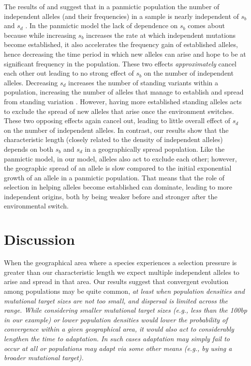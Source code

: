 \documentclass{article}
\newcommand{\gc}[1]{{\it\color{blue}#1}}
\newcommand{\mfp}[1]{{\it\color{red}#1}}
\begin{document}
The results of \citet{softsweepsI} and \citet{softsweepsII} suggest that in a
panmictic population the number of independent alleles (and their frequencies) in a sample
is nearly independent of $s_b$ and $s_d$  \citep[although this
breaks down with fluctuating population size,
][]{Wilson-softsweep}. In the panmictic model the
lack of dependence on $s_b$ comes about because while increasing $s_b$
increases the rate at which independent mutations become established,
it also accelerates the frequency gain of established alleles, 
hence decreasing the time period in which new alleles can arise and hope to be at significant frequency in the population. 
These two effects \mfp{approximately} cancel each other out leading to no strong effect of $s_b$ on the number of independent alleles. 
Decreasing $s_d$ increases the number of standing variants within a population, 
increasing the number of alleles that manage to establish and spread from standing variation \citep{softsweepsI,Orr:01}. 
However, having more established standing alleles
acts to exclude the spread of new alleles that arise once the environment switches. 
These two opposing effects again cancel out, leading to little overall
effect of $s_d$ on the number of independent alleles.
In contrast, our results show that the characteristic length 
(closely related to the density of independent alleles) 
depends on both $s_b$ and $s_d$ in a geographically spread population. 
Like the panmictic model, in our model, alleles also act to exclude each other; 
however, the geographic spread of an allele is slow compared to the initial exponential growth of an allele in a panmictic population. 
That means that the role of selection in helping
alleles become established can dominate, leading to more independent origins, both by
being  weaker before and stronger after the environmental switch. 



\section{Discussion}

When the geographical area where a species experiences a 
selection pressure is greater than our characteristic
length we expect multiple independent alleles to arise and
spread in that area. Our results suggest that convergent evolution
among populations may be quite common, \gc{at least when population
densities and mutational target sizes are not too small, and dispersal is
limited across the range.  While considering smaller mutational
target sizes (e.g., less than the 100bp in our example) or lower population densities would lower the probability of convergence
within a given geographical area, it would also act to considerably lengthen
the time to adaptation. In such cases adaptation may simply fail to
occur at all or populations may adapt via some other means (e.g., by using a
broader mutational target). 
}
\end{document}
